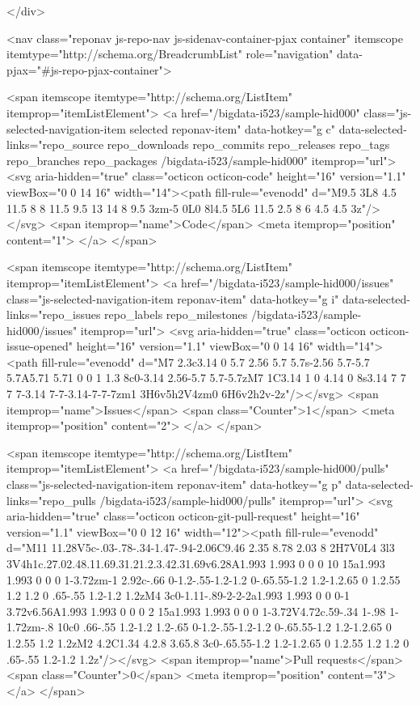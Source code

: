       </div>
      
<nav class="reponav js-repo-nav js-sidenav-container-pjax container"
     itemscope
     itemtype="http://schema.org/BreadcrumbList"
     role="navigation"
     data-pjax="#js-repo-pjax-container">

  <span itemscope itemtype="http://schema.org/ListItem" itemprop="itemListElement">
    <a href="/bigdata-i523/sample-hid000" class="js-selected-navigation-item selected reponav-item" data-hotkey="g c" data-selected-links="repo_source repo_downloads repo_commits repo_releases repo_tags repo_branches repo_packages /bigdata-i523/sample-hid000" itemprop="url">
      <svg aria-hidden="true" class="octicon octicon-code" height="16" version="1.1" viewBox="0 0 14 16" width="14"><path fill-rule="evenodd" d="M9.5 3L8 4.5 11.5 8 8 11.5 9.5 13 14 8 9.5 3zm-5 0L0 8l4.5 5L6 11.5 2.5 8 6 4.5 4.5 3z"/></svg>
      <span itemprop="name">Code</span>
      <meta itemprop="position" content="1">
</a>  </span>

    <span itemscope itemtype="http://schema.org/ListItem" itemprop="itemListElement">
      <a href="/bigdata-i523/sample-hid000/issues" class="js-selected-navigation-item reponav-item" data-hotkey="g i" data-selected-links="repo_issues repo_labels repo_milestones /bigdata-i523/sample-hid000/issues" itemprop="url">
        <svg aria-hidden="true" class="octicon octicon-issue-opened" height="16" version="1.1" viewBox="0 0 14 16" width="14"><path fill-rule="evenodd" d="M7 2.3c3.14 0 5.7 2.56 5.7 5.7s-2.56 5.7-5.7 5.7A5.71 5.71 0 0 1 1.3 8c0-3.14 2.56-5.7 5.7-5.7zM7 1C3.14 1 0 4.14 0 8s3.14 7 7 7 7-3.14 7-7-3.14-7-7-7zm1 3H6v5h2V4zm0 6H6v2h2v-2z"/></svg>
        <span itemprop="name">Issues</span>
        <span class="Counter">1</span>
        <meta itemprop="position" content="2">
</a>    </span>

  <span itemscope itemtype="http://schema.org/ListItem" itemprop="itemListElement">
    <a href="/bigdata-i523/sample-hid000/pulls" class="js-selected-navigation-item reponav-item" data-hotkey="g p" data-selected-links="repo_pulls /bigdata-i523/sample-hid000/pulls" itemprop="url">
      <svg aria-hidden="true" class="octicon octicon-git-pull-request" height="16" version="1.1" viewBox="0 0 12 16" width="12"><path fill-rule="evenodd" d="M11 11.28V5c-.03-.78-.34-1.47-.94-2.06C9.46 2.35 8.78 2.03 8 2H7V0L4 3l3 3V4h1c.27.02.48.11.69.31.21.2.3.42.31.69v6.28A1.993 1.993 0 0 0 10 15a1.993 1.993 0 0 0 1-3.72zm-1 2.92c-.66 0-1.2-.55-1.2-1.2 0-.65.55-1.2 1.2-1.2.65 0 1.2.55 1.2 1.2 0 .65-.55 1.2-1.2 1.2zM4 3c0-1.11-.89-2-2-2a1.993 1.993 0 0 0-1 3.72v6.56A1.993 1.993 0 0 0 2 15a1.993 1.993 0 0 0 1-3.72V4.72c.59-.34 1-.98 1-1.72zm-.8 10c0 .66-.55 1.2-1.2 1.2-.65 0-1.2-.55-1.2-1.2 0-.65.55-1.2 1.2-1.2.65 0 1.2.55 1.2 1.2zM2 4.2C1.34 4.2.8 3.65.8 3c0-.65.55-1.2 1.2-1.2.65 0 1.2.55 1.2 1.2 0 .65-.55 1.2-1.2 1.2z"/></svg>
      <span itemprop="name">Pull requests</span>
      <span class="Counter">0</span>
      <meta itemprop="position" content="3">
</a>  </span>

